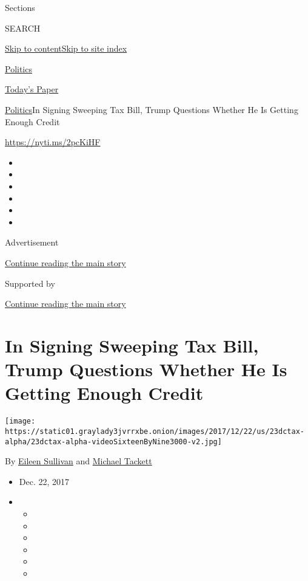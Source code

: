 Sections

SEARCH

\protect\hyperlink{site-content}{Skip to
content}\protect\hyperlink{site-index}{Skip to site index}

\href{https://www.nytimes3xbfgragh.onion/section/politics}{Politics}

\href{https://myaccount.nytimes3xbfgragh.onion/auth/login?response_type=cookie\&client_id=vi}{}

\href{https://www.nytimes3xbfgragh.onion/section/todayspaper}{Today's
Paper}

\href{/section/politics}{Politics}\textbar{}In Signing Sweeping Tax
Bill, Trump Questions Whether He Is Getting Enough Credit

\url{https://nyti.ms/2pcKiHF}

\begin{itemize}
\item
\item
\item
\item
\item
\item
\end{itemize}

Advertisement

\protect\hyperlink{after-top}{Continue reading the main story}

Supported by

\protect\hyperlink{after-sponsor}{Continue reading the main story}

\hypertarget{in-signing-sweeping-tax-bill-trump-questions-whether-he-is-getting-enough-credit}{%
\section{In Signing Sweeping Tax Bill, Trump Questions Whether He Is
Getting Enough
Credit}\label{in-signing-sweeping-tax-bill-trump-questions-whether-he-is-getting-enough-credit}}

\texttt{[image: https://static01.graylady3jvrrxbe.onion/images/2017/12/22/us/23dctax-alpha/23dctax-alpha-videoSixteenByNine3000-v2.jpg]}

By \href{https://www.nytimes3xbfgragh.onion/by/eileen-sullivan}{Eileen
Sullivan} and
\href{https://www.nytimes3xbfgragh.onion/by/michael-tackett}{Michael
Tackett}

\begin{itemize}
\item
  Dec. 22, 2017
\item
  \begin{itemize}
  \item
  \item
  \item
  \item
  \item
  \item
  \end{itemize}
\end{itemize}

